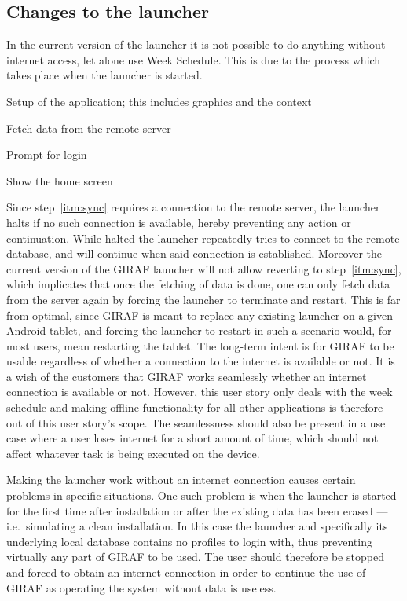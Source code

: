 \subsection{Changes to the launcher}
\label{sub:changes_to_the_launcher}
In the current version of the launcher it is not possible to do anything without internet access, let alone use Week Schedule.
This is due to the process which takes place when the launcher is started. 
\begin{enumberate}
    \item Setup of the application; this includes graphics and the context
    \item\label{itm:sync} Fetch data from the remote server
    \item Prompt for login
    \item Show the home screen
\end{enumberate}
Since step~\ref{itm:sync} requires a connection to the remote server, the launcher halts if no such connection is available, hereby preventing any action or continuation.
While halted the launcher repeatedly tries to connect to the remote database, and will continue when said connection is established.
Moreover the current version of the GIRAF launcher will not allow reverting to step~\ref{itm:sync}, which implicates that once the fetching of data is done, one can only fetch data from the server again by forcing the launcher to terminate and restart.
This is far from optimal, since GIRAF is meant to replace any existing launcher on a given Android tablet, and forcing the launcher to restart in such a scenario would, for most users, mean restarting the tablet.
The long-term intent is for GIRAF to be usable regardless of whether a connection to the internet is available or not.
It is a wish of the customers that GIRAF works seamlessly whether an internet connection is available or not.
However, this user story only deals with the week schedule and making offline functionality for all other applications is therefore out of this user story's scope.
The seamlessness should also be present in a use case where a user loses internet for a short amount of time, which should not affect whatever task is being executed on the device. 

\bigskip \noindent
Making the launcher work without an internet connection causes certain problems in specific situations.
One such problem is when the launcher is started for the first time after installation or after the existing data has been erased --- i.e.\ simulating a clean installation. 
In this case the launcher and specifically its underlying local database contains no profiles to login with, thus preventing virtually any part of GIRAF to be used. 
The user should therefore be stopped and forced to obtain an internet connection in order to continue the use of GIRAF as operating the system without data is useless. 

